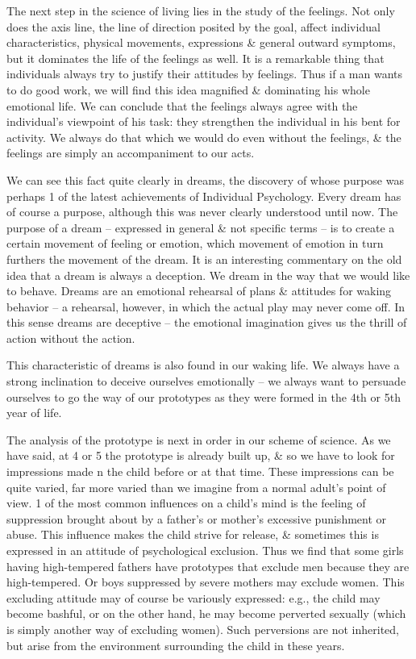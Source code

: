 \documentclass{article}
\begin{document}
The next step in the science of living lies in the study of the feelings. Not only does the axis line, the line of direction posited by the goal, affect individual characteristics, physical movements, expressions \& general outward symptoms, but it dominates the life of the feelings as well. It is a remarkable thing that individuals always try to justify their attitudes by feelings. Thus if a man wants to do good work, we will find this idea magnified \& dominating his whole emotional life. We can conclude that the feelings always agree with the individual's viewpoint of his task: they strengthen the individual in his bent for activity. We always do that which we would do even without the feelings, \& the feelings are simply an accompaniment to our acts.

We can see this fact quite clearly in dreams, the discovery of whose purpose was perhaps 1 of the latest achievements of Individual Psychology. Every dream has of course a purpose, although this was never clearly understood until now. The purpose of a dream -- expressed in general \& not specific terms -- is to create a certain movement of feeling or emotion, which movement of emotion in turn furthers the movement of the dream. It is an interesting commentary on the old idea that a dream is always a deception. We dream in the way that we would like to behave. Dreams are an emotional rehearsal of plans \& attitudes for waking behavior -- a rehearsal, however, in which the actual play may never come off. In this sense dreams are deceptive -- the emotional imagination gives us the thrill of action without the action.

This characteristic of dreams is also found in our waking life. We always have a strong inclination to deceive ourselves emotionally -- we always want to persuade ourselves to go the way of our prototypes as they were formed in the 4th or 5th year of life.

The analysis of the prototype is next in order in our scheme of science. As we have said, at 4 or 5 the prototype is already built up, \& so we have to look for impressions made n the child before or at that time. These impressions can be quite varied, far more varied than we imagine from a normal adult's point of view. 1 of the most common influences on a child's mind is the feeling of suppression brought about by a father's or mother's excessive punishment or abuse. This influence makes the child strive for release, \& sometimes this is expressed in an attitude of psychological exclusion. Thus we find that some girls having high-tempered fathers have prototypes that exclude men because they are high-tempered. Or boys suppressed by severe mothers may exclude women. This excluding attitude may of course be variously expressed: e.g., the child may become bashful, or on the other hand, he may become perverted sexually (which is simply another way of excluding women). Such perversions are not inherited, but arise from the environment surrounding the child in these years.
\end{document}
